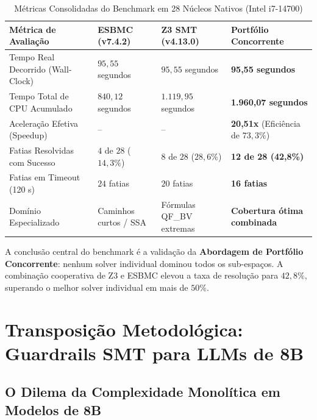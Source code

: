 \documentclass[11pt,a4paper]{article}
\theoremstyle{definition}
\begin{document}
\begin{table}[!ht]
\centering
\small
\caption{Métricas Consolidadas do Benchmark em 28 Núcleos Nativos (Intel i7-14700)}
\label{tab:benchmark_28c}
\vspace{0.15cm}
\begin{tabularx}{\textwidth}{l X X X}
\toprule
\textbf{Métrica de Avaliação} & \textbf{ESBMC (v7.4.2)} & \textbf{Z3 SMT (v4.13.0)} & \textbf{Portfólio Concorrente} \\
\midrule
Tempo Real Decorrido (Wall-Clock) & $95{,}55$ segundos & $95{,}55$ segundos & \textbf{95,55 segundos} \\
Tempo Total de CPU Acumulado & $840{,}12$ segundos & $1.119{,}95$ segundos & \textbf{1.960,07 segundos} \\
Aceleração Efetiva (Speedup) & -- & -- & \textbf{20,51x} (Eficiência de $73{,}3\%$) \\
Fatias Resolvidas com Sucesso & $4$ de $28$ ($14{,}3\%$) & $8$ de $28$ ($28{,}6\%$) & \textbf{12 de 28 (42,8\%)} \\
Fatias em Timeout (120 s) & $24$ fatias & $20$ fatias & \textbf{16 fatias} \\
Domínio Especializado & Caminhos curtos / SSA & Fórmulas QF\_BV extremas & \textbf{Cobertura ótima combinada} \\
\bottomrule
\end{tabularx}
\end{table}

\noindent A conclusão central do benchmark é a validação da \textbf{Abordagem de Portfólio Concorrente}: nenhum solver individual dominou todos os sub-espaços. A combinação cooperativa de Z3 e ESBMC elevou a taxa de resolução para $42{,}8\%$, superando o melhor solver individual em mais de $50\%$.

\section{Transposição Metodológica: Guardrails SMT para LLMs de 8B}

\subsection{O Dilema da Complexidade Monolítica em Modelos de 8B}
\end{document}
